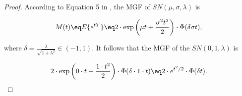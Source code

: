 \begin{proof}
  According to Equation 5 in \citet{azzalini}, the MGF of $SN(\mu, \sigma,
  \lambda)$ is

  \begin{equation*}
    M(t) \eq E\{e^{tY}\} \eq 2 \cdot \exp \left( \mu t + \frac{\sigma^2 t^2}{2} \right) \cdot \Phi(\delta \sigma t),
  \end{equation*}

  where $\delta = \frac{\lambda}{\sqrt{1 + \lambda^2}} \in (-1, 1)$. It follows
  that the MGF of the $SN(0, 1, \lambda)$ is

  \begin{equation*}
    2 \cdot \exp \left( 0 \cdot t + \frac{1 \cdot t^2}{2} \right) \cdot \Phi(\delta \cdot 1 \cdot t) \eq 2 \cdot e^{t^2/2} \cdot \Phi(\delta t).
  \end{equation*}
\end{proof}
